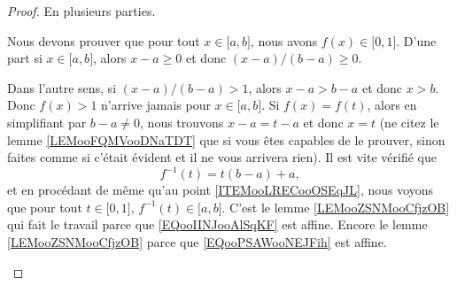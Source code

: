 \begin{proof}
	En plusieurs parties.
	\begin{subproof}
		     \label{ITEMooLRECooOSEqJL}
		Nous devons prouver que pour tout \( x\in\mathopen[ a , b \mathclose]\), nous avons \( f(x)\in \mathopen[ 0 , 1 \mathclose]\). D'une part si \( x\in\mathopen[ a , b \mathclose]\), alors \( x-a\geq 0\) et donc \( (x-a)/(b-a)\geq 0\).

		Dans l'autre sens, si \( (x-a)/(b-a)>1\), alors \( x-a>b-a\) et donc \( x>b\). Donc \( f(x)>1\) n'arrive jamais pour \( x\in \mathopen[ a , b \mathclose]\).
		\spitem[Injectif]
		Si \( f(x)=f(t)\), alors en simplifiant par \( b-a\neq 0\), nous trouvons \( x-a=t-a\) et donc \( x=t\) (ne citez le lemme \ref{LEMooFQMVooDNaTDT} que si vous êtes capables de le prouver, sinon faites comme si c'était évident et il ne vous arrivera rien).
		\spitem[Surjectif]
		Il est vite vérifié que
		\begin{equation}       \label{EQooPSAWooNEJFih}
			f^{-1}(t)=t(b-a)+a,
		\end{equation}
		et en procédant de même qu'au point \ref{ITEMooLRECooOSEqJL}, nous voyons que pour tout \( t\in \mathopen[ 0 , 1 \mathclose]\), \( f^{-1}(t)\in\mathopen[ a , b \mathclose]\).
		C'est le lemme \ref{LEMooZSNMooCfjzOB} qui fait le travail parce que \eqref{EQooIINJooAlSqKF} est affine.
		Encore le lemme \ref{LEMooZSNMooCfjzOB} parce que \eqref{EQooPSAWooNEJFih} est affine.
	\end{subproof}
\end{proof}
